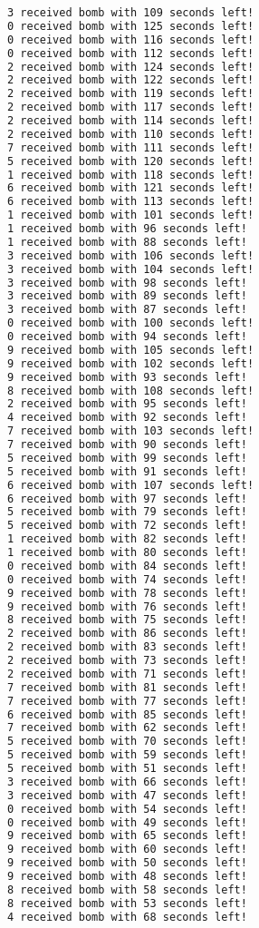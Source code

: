\documentclass{article}
\begin{document}
\begin{lstlisting}[language=bash]
3 received bomb with 109 seconds left!
0 received bomb with 125 seconds left!
0 received bomb with 116 seconds left!
0 received bomb with 112 seconds left!
2 received bomb with 124 seconds left!
2 received bomb with 122 seconds left!
2 received bomb with 119 seconds left!
2 received bomb with 117 seconds left!
2 received bomb with 114 seconds left!
2 received bomb with 110 seconds left!
7 received bomb with 111 seconds left!
5 received bomb with 120 seconds left!
1 received bomb with 118 seconds left!
6 received bomb with 121 seconds left!
6 received bomb with 113 seconds left!
1 received bomb with 101 seconds left!
1 received bomb with 96 seconds left!
1 received bomb with 88 seconds left!
3 received bomb with 106 seconds left!
3 received bomb with 104 seconds left!
3 received bomb with 98 seconds left!
3 received bomb with 89 seconds left!
3 received bomb with 87 seconds left!
0 received bomb with 100 seconds left!
0 received bomb with 94 seconds left!
9 received bomb with 105 seconds left!
9 received bomb with 102 seconds left!
9 received bomb with 93 seconds left!
8 received bomb with 108 seconds left!
2 received bomb with 95 seconds left!
4 received bomb with 92 seconds left!
7 received bomb with 103 seconds left!
7 received bomb with 90 seconds left!
5 received bomb with 99 seconds left!
5 received bomb with 91 seconds left!
6 received bomb with 107 seconds left!
6 received bomb with 97 seconds left!
5 received bomb with 79 seconds left!
5 received bomb with 72 seconds left!
1 received bomb with 82 seconds left!
1 received bomb with 80 seconds left!
0 received bomb with 84 seconds left!
0 received bomb with 74 seconds left!
9 received bomb with 78 seconds left!
9 received bomb with 76 seconds left!
8 received bomb with 75 seconds left!
2 received bomb with 86 seconds left!
2 received bomb with 83 seconds left!
2 received bomb with 73 seconds left!
2 received bomb with 71 seconds left!
7 received bomb with 81 seconds left!
7 received bomb with 77 seconds left!
6 received bomb with 85 seconds left!
7 received bomb with 62 seconds left!
5 received bomb with 70 seconds left!
5 received bomb with 59 seconds left!
5 received bomb with 51 seconds left!
3 received bomb with 66 seconds left!
3 received bomb with 47 seconds left!
0 received bomb with 54 seconds left!
0 received bomb with 49 seconds left!
9 received bomb with 65 seconds left!
9 received bomb with 60 seconds left!
9 received bomb with 50 seconds left!
9 received bomb with 48 seconds left!
8 received bomb with 58 seconds left!
8 received bomb with 53 seconds left!
4 received bomb with 68 seconds left!

\end{lstlisting}
\end{document}
